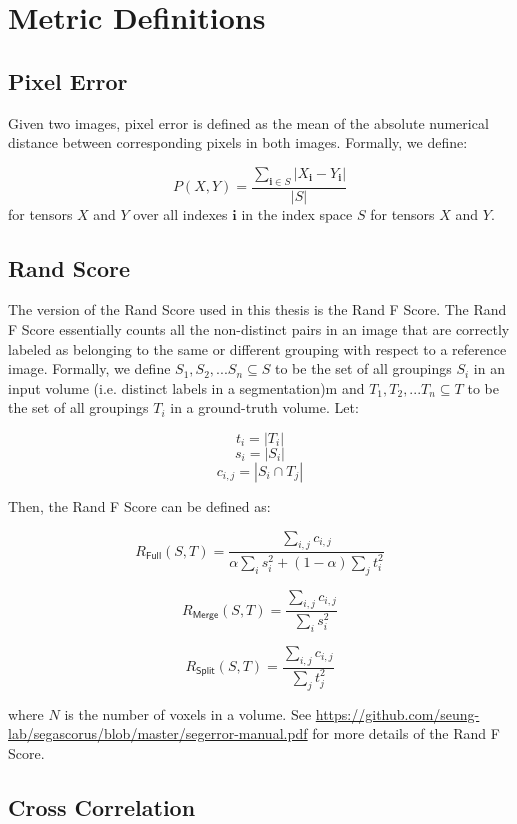\chapter{Metric Definitions}

\section{Pixel Error}
Given two images, pixel error is defined as the mean of the absolute numerical distance between corresponding pixels in both images. Formally, we define:

$$P(X, Y) = \frac{\sum_{\bm{i} \in S}{|X_{\bm{i}} - Y_{\bm{i}}|}}{|S|}$$
for tensors $X$ and $Y$ over all indexes $\bm{i}$ in the index space $S$ for tensors $X$ and $Y$.

\section{Rand Score}

The version of the Rand Score used in this thesis is the Rand F Score. The Rand F Score essentially counts all the non-distinct pairs in an image that are correctly labeled as belonging to the same or different grouping with respect to a reference image. Formally, we define $S_1, S_2, ... S_n \subseteq S$ to be the set of all groupings $S_i$ in an input volume (i.e. distinct labels in a segmentation)m and $T_1, T_2, ... T_n \subseteq T$ to be the set of all groupings $T_i$ in a ground-truth volume. Let:

$$ t_i = |T_i| $$
$$ s_i = |S_i| $$
$$ c_{i,j} = |S_i \cap T_j| $$

Then, the Rand F Score can be defined as:

$$R_{\mathsf{Full}}(S,T) = \frac{\sum_{i,j}{c_{i,j}}}{\alpha \sum_{i}{s_i^2} + (1 - \alpha)\sum_j{t_i^2}}$$ 

$$R_{\mathsf{Merge}}(S,T) = \frac{\sum_{i,j}{c_{i,j}}}{\sum_{i}{s_i^2}}$$  

$$R_{\mathsf{Split}}(S,T) = \frac{\sum_{i,j}{c_{i,j}}}{\sum_{j}{t_j^2}}$$  


where $N$ is the number of voxels in a volume. See \url{https://github.com/seung-lab/segascorus/blob/master/segerror-manual.pdf} for more details of the Rand F Score.

\section{Cross Correlation}

